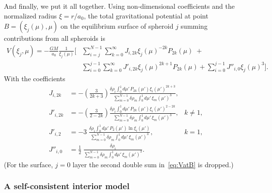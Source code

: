 \documentclass[amsmath,amsfonts,rmp,letterpaper]{revtex4}
\renewcommand{\inf}{\infty}
\newcommand{\ptk}{P_{2k}}
\newcommand{\sumonk}{\sum_{k=0}^{\inf}}
\newcommand{\dro}{\delta\rho}
\newcommand{\mupint}{\int_{0}^{1}d\mu'\,}
\begin{document}
And finally, we put it all together. Using non-dimensional coefficients and the
normalized radius $\xi=r/a_0$, the total gravitational potential at point
$B=(\xi_j(\mu),\mu)$ on the equilibrium surface of spheroid $j$ summing
contributions from all spheroids is
\begin{equation}\label{eq:VatB}
\begin{split}
V(\xi_j,\mu) = 
-\frac{GM}{a_0}\frac{1}{\xi_j(\mu)}\Biggl[
&\sum_{i=j}^{N-1}\sumonk{}J_{i,2k}\xi_j(\mu)^{-2k}\ptk(\mu)\; + \\
& \sum_{i=0}^{j-1}\sumonk{}J'_{i,2k}\xi_j(\mu)^{2k+1}\ptk(\mu) + 
  \sum_{i=0}^{j-1} J''_{i,0}\xi_j(\mu)^3
\Biggr].
\end{split}
\end{equation}
With the coefficients
\begin{subequations}\label{eq:J_menagerie}
\begin{align}
J_{i,2k} &= -\left(\frac{3}{2k + 3}\right)
\frac{\dro_i\mupint\ptk(\mu')\xi_i(\mu')^{2k + 3}}
{\sum_{m=0}^{N-1}\dro_m\mupint\xi_m(\mu')^3},\\
J'_{i,2k} &= -\left(\frac{3}{2 - 2k}\right)
\frac{\dro_i\mupint\ptk(\mu')\xi_i(\mu')^{2 - 2k}}
{\sum_{m=0}^{N-1}\dro_m\mupint\xi_m(\mu')^3}, & k\ne{1},\\
J'_{i,2} &= -3\;
\frac{\dro_i\mupint{}P_2(\mu')\ln{\xi_i(\mu')}}
{\sum_{m=0}^{N-1}\dro_m\mupint\xi_m(\mu')^3}, & k=1,\\
J''_{i,0} &= \frac{1}{2}\;
\frac{\dro_i}{\sum_{m=0}^{N-1}\dro_m\mupint\xi_m(\mu')^3}.
\end{align}
\end{subequations}
(For the surface, $j=0$ layer the second double sum in~\eqref{eq:VatB} is
dropped.)

\subsubsection{A self-consistent interior model}
\end{document}
